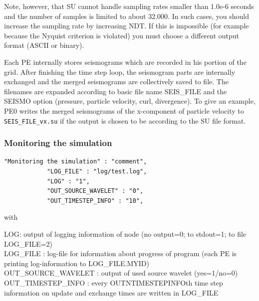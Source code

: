 \documentclass[11pt,onecolumn,oneside]{article}
\begin{document}
Note, however, that SU cannot handle sampling rates smaller than 1.0e-6 seconds and the number of samples is limited to about 32.000. In such cases, you should increase the sampling rate by increasing NDT. If this is impossible (for example because the Nyquist criterion is violated) you must choose a different output format (ASCII or binary).

Each PE internally stores seismograms which are recorded in his portion of the grid. After finishing the time step loop, the seismogram parts are internally exchanged and the merged seismograms are collectively saved to file. The filenames are expanded according to basic file name SEIS\_FILE and the SEISMO option (pressure, particle velocity, curl, divergence). To give an example, PE0 writes the merged seismograms of the x-component of particle velocity to  \lstinline{SEIS_FILE_vx.su} if the output is chosen to be according to the SU file format. 


\subsubsection{Monitoring the simulation}
\begin{verbatim}
"Monitoring the simulation" : "comment",
            "LOG_FILE" : "log/test.log",
            "LOG" : "1",
            "OUT_SOURCE_WAVELET" : "0",
            "OUT_TIMESTEP_INFO" : "10",

\end{verbatim}

with

LOG: output of logging information of node (no output=0; to stdout=1; to file LOG\_FILE=2)\\
LOG\_FILE : log-file for information about progress of program (each PE is printing log-information to LOG\_FILE.MYID) \\
OUT\_SOURCE\_WAVELET : output of used source wavelet (yes=1/no=0) \\
OUT\_TIMESTEP\_INFO : every OUTNTIMESTEPINFOth time step information on update and exchange times are written in LOG\_FILE 
\end{document}
